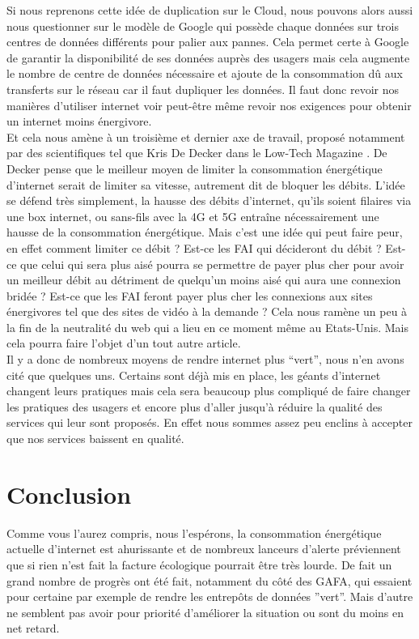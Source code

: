 \documentclass[a4paper,twocolumn,12pt]{article}
\begin{document}
	Si nous reprenons cette idée de duplication sur le Cloud, nous pouvons alors aussi nous questionner sur le modèle de Google qui possède chaque données sur trois centres de données différents pour palier aux pannes. Cela permet certe à Google de garantir la disponibilité de ses données auprès des usagers mais cela augmente le nombre de centre de données nécessaire et ajoute de la consommation dû aux transferts sur le réseau car il faut dupliquer les données. Il faut donc revoir nos manières d’utiliser internet voir peut-être même revoir nos exigences pour obtenir un internet moins énergivore. \\

	Et cela nous amène à un troisième et dernier axe de travail, proposé notamment par des scientifiques tel que Kris De Decker dans le Low-Tech Magazine \cite{4}. De Decker pense que le meilleur moyen de limiter la consommation énergétique d’internet serait de limiter sa vitesse, autrement dit de bloquer les débits. L’idée se défend très simplement, la hausse des débits d’internet, qu’ils soient filaires via une box internet, ou sans-fils avec la 4G et 5G entraîne nécessairement une hausse de la consommation énergétique. Mais c’est une idée qui peut faire peur, en effet comment limiter ce débit ? Est-ce les FAI qui décideront du débit ? Est-ce que celui qui sera plus aisé pourra se permettre de payer plus cher pour avoir un meilleur débit au détriment de quelqu'un moins aisé qui aura une connexion bridée ? Est-ce que les FAI feront payer plus cher les connexions aux sites énergivores tel que des sites de vidéo à la demande ? Cela nous ramène un peu à la fin de la neutralité du web qui a lieu en ce moment même au Etats-Unis. Mais cela pourra faire l'objet d'un tout autre article. \\
	
	Il y a donc de nombreux moyens de rendre internet plus “vert”, nous n’en avons cité que quelques uns. Certains sont déjà mis en place, les géants d'internet changent leurs pratiques mais cela sera beaucoup plus compliqué de faire changer les pratiques des usagers et encore plus d’aller jusqu’à réduire la qualité des services qui leur sont proposés. En effet nous sommes assez peu enclins à accepter que nos services baissent en qualité.
	
\section{Conclusion} 

	Comme vous l’aurez compris, nous l’espérons, la consommation énergétique actuelle d’internet est ahurissante et de nombreux lanceurs d’alerte préviennent que si rien n’est fait la facture écologique pourrait être très lourde. De fait un grand nombre de progrès ont été fait, notamment du côté des GAFA, qui essaient pour certaine par exemple de rendre les entrepôts de données ''vert''. Mais d’autre ne semblent pas avoir pour priorité d’améliorer la situation ou sont du moins en net retard. \\
\end{document}
